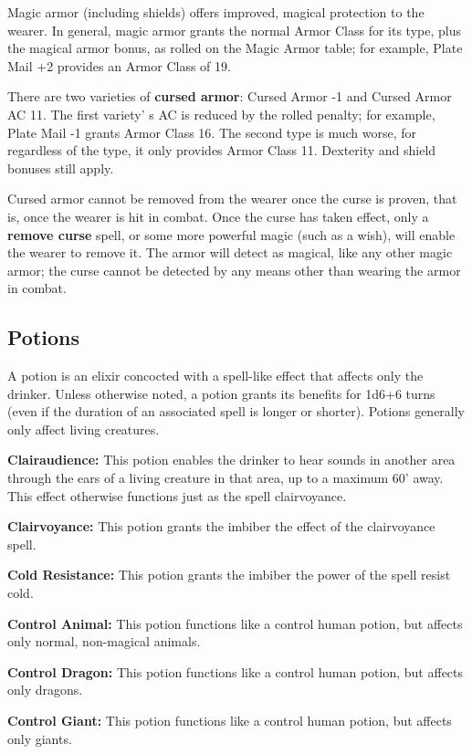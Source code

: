 \documentclass[a4paper,twoside,openany,10pt]{book}
\begin{document}
\begin{multicols}{2}
Magic armor (including shields) offers improved, magical protection to the wearer. In general, magic armor grants the normal Armor Class for its type, plus the magical armor bonus, as rolled on the Magic Armor table; for example, Plate Mail +2 provides an Armor Class of 19.

There are two varieties of \textbf{cursed armor}: Cursed Armor -1 and Cursed Armor AC 11. The first variety' s AC is reduced by the rolled penalty; for example, Plate Mail -1 grants Armor Class 16. The second type is much worse, for regardless of the type, it only provides Armor Class 11. Dexterity and shield bonuses still apply.

Cursed armor cannot be removed from the wearer once the curse is proven, that is, once the wearer is hit in combat. Once the curse has taken effect, only a \textbf{remove curse} spell, or some more powerful magic (such as a wish), will enable the wearer to remove it. The armor will detect as magical, like any other magic armor; the curse cannot be detected by any means other than wearing the armor in combat.

\subsection{Potions}\label{potions-1}

A potion is an elixir concocted with a spell-like effect that affects only the drinker. Unless otherwise noted, a potion grants its benefits for 1d6+6 turns (even if the duration of an associated spell is longer or shorter). Potions generally only affect living creatures.

\textbf{Clairaudience: }This potion enables the drinker to hear sounds in another area through the ears of a living creature in that area, up to a maximum 60' away. This effect otherwise functions just as the spell clairvoyance.

\textbf{Clairvoyance: }This potion grants the imbiber the effect of the clairvoyance spell.

\textbf{Cold Resistance:} This potion grants the imbiber the power of the spell resist cold.

\textbf{Control Animal: }This potion functions like a control human potion, but affects only normal, non-magical animals.

\textbf{Control Dragon: }This potion functions like a control human potion, but affects only dragons.

\textbf{Control Giant:} This potion functions like a control human potion, but affects only giants.


\end{multicols}
\end{document}
